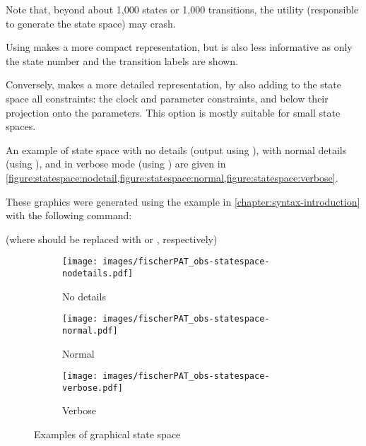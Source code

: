 Note that, beyond about 1,000 states or 1,000 transitions, the \gdot{} utility (responsible to generate the state space) may crash.

Using  makes a more compact representation, but is also less informative as only the state number and the transition labels are shown.

Conversely,  makes a more detailed representation, by also adding to the state space all constraints:
the clock and parameter constraints, and below their projection onto the parameters.
This option is mostly suitable for small state spaces.

\begin{example}
	An example of state space with no details (output using ), with normal details (using ), and in verbose mode (using ) are given in \cref{figure:statespace:nodetail,figure:statespace:normal,figure:statespace:verbose}.

	These graphics were generated using the example in \cref{chapter:syntax-introduction} with the following command:


	(where  should be replaced with  or , respectively)
\end{example}

\begin{figure}
	\centering
	\begin{subfigure}[b]{.48\textwidth}
		\texttt{[image: images/fischerPAT\_obs-statespace-nodetails.pdf]}

		\caption{No details}
		\label{figure:statespace:nodetail}
	\end{subfigure}
	\begin{subfigure}[b]{.48\textwidth}
		\texttt{[image: images/fischerPAT\_obs-statespace-normal.pdf]}

		\caption{Normal}
		\label{figure:statespace:normal}
	\end{subfigure}

	\begin{subfigure}[b]{.75\textwidth}
		\texttt{[image: images/fischerPAT\_obs-statespace-verbose.pdf]}

		\caption{Verbose}
		\label{figure:statespace:verbose}
	\end{subfigure}

	\caption{Examples of graphical state space}
\end{figure}



